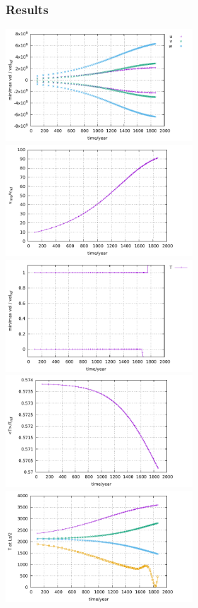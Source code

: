 \subsubsection*{Results}

\begin{center}
\includegraphics[width=7cm]{python_codes/fieldstone_20/images/velstats.pdf}
\includegraphics[width=7cm]{python_codes/fieldstone_20/images/vrms.pdf}\\
\includegraphics[width=7cm]{python_codes/fieldstone_20/images/Tstats.pdf}
\includegraphics[width=7cm]{python_codes/fieldstone_20/images/Tavrg.pdf}\\
\includegraphics[width=7cm]{python_codes/fieldstone_20/images/Tmid.pdf}

\end{center}
